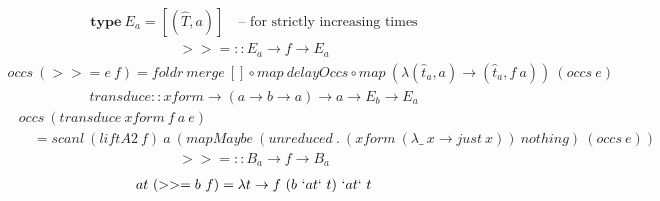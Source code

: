 \documentclass[fleqn]{amsart}
\begin{document}
\begin{align*}
  \textbf{type}\ E_a = [(\hat{T}, a)]\quad\text{-- for strictly increasing times}
\end{align*}
\begin{align*}
  >>= :: E_a \rightarrow f \rightarrow E_a
\end{align*}
\begin{align*}
  occs\ (>>= e\ f) = foldr\ merge\ []\circ map\ delayOccs\circ map\ (\lambda(\hat{t}_a, a) \rightarrow (\hat{t}_a , f\ a))\ (occs\ e)
\end{align*}
\begin{align*}
  transduce :: xform \rightarrow (a \rightarrow b \rightarrow a) \rightarrow a \rightarrow E_b \rightarrow E_a
\end{align*}
\begin{align*}
  &occs\ (transduce\ xform\ f\ a\ e)\\
  &\quad= scanl\ (liftA2\ f)\ a\ (mapMaybe\ (unreduced\ .\ (xform\ (\lambda\_\ x\rightarrow just\ x))\ nothing)\ (occs\ e))
\end{align*}
\begin{align*}
  >>= :: B_a \rightarrow f \rightarrow B_a
\end{align*}
\begin{align*}
  at\ (>>= b\ f) =\lambda t \rightarrow f\ (b\ `at` \ t)\ `at` \ t
\end{align*}
\end{document}
